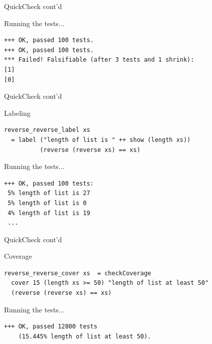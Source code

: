 \documentclass{beamer} %
\begin{document}
\begin{frame}[fragile]{QuickCheck cont'd}
\begin{block}{Running the tests...}
\begin{footnotesize}
\begin{verbatim}
+++ OK, passed 100 tests.
+++ OK, passed 100 tests.
*** Failed! Falsifiable (after 3 tests and 1 shrink):     
[1]
[0]
\end{verbatim}
\end{footnotesize}
\end{block}
\end{frame}

\begin{frame}[fragile]{QuickCheck cont'd}
\begin{block}{Labeling}
\begin{verbatim}
reverse_reverse_label xs  
  = label ("length of list is " ++ show (length xs)) 
          (reverse (reverse xs) == xs)
\end{verbatim}
\end{block}

\begin{block}{Running the tests...}
\begin{footnotesize}
\begin{verbatim}
+++ OK, passed 100 tests:
 5% length of list is 27
 5% length of list is 0
 4% length of list is 19
 ...
\end{verbatim}
\end{footnotesize}
\end{block}
\end{frame}

\begin{frame}[fragile]{QuickCheck cont'd}
\begin{block}{Coverage}
\begin{verbatim}
reverse_reverse_cover xs  = checkCoverage 
  cover 15 (length xs >= 50) "length of list at least 50"
  (reverse (reverse xs) == xs)
\end{verbatim}
\end{block}

\begin{block}{Running the tests...}
\begin{footnotesize}
\begin{verbatim}
+++ OK, passed 12800 tests 
    (15.445% length of list at least 50).
\end{verbatim}
\end{footnotesize}
\end{block}
\end{frame}
\end{document}
